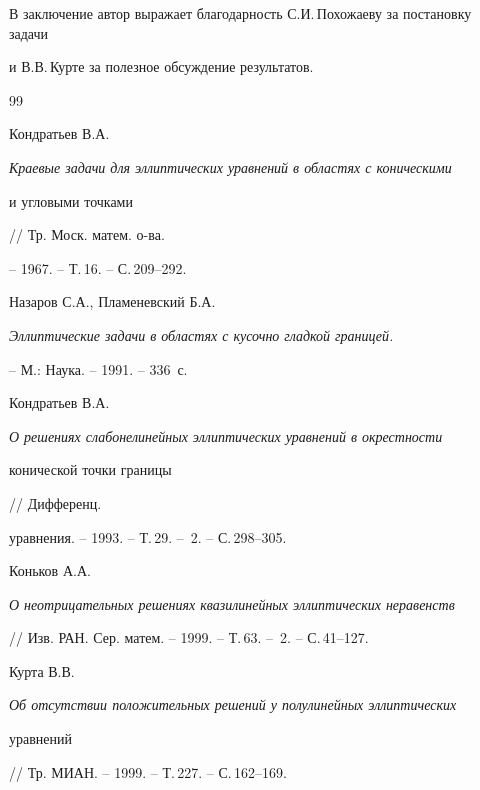 В заключение автор выражает благодарность С.И.\,Похожаеву за постановку задачи


и В.В.\,Кур\-те за полезное обсуждение результатов.








\begin{thebibliography}{99}







Кондратьев В.А.


{\em Краевые задачи для эллиптических уравнений в областях с коническими


и угловыми точками} // Тр. Моск. матем. о-ва.


-- 1967. -- Т.\,16. -- С.\,209--292.







Назаров С.А., Пламеневский Б.А.


{\em Эллиптические задачи в областях с кусочно гладкой границей.}


-- М.: Наука. -- 1991. -- 336~с.







Кондратьев В.А.


{\em О решениях слабонелинейных эллиптических уравнений в окрестности


конической точки границы} // Дифференц.


уравнения. -- 1993. -- Т.\,29. -- \No\,2. -- С.\,298--305.





 Коньков А.А.


{\em О неотрицательных решениях квазилинейных эллиптических неравенств}


// Изв. РАН. Сер. матем. -- 1999. -- Т.\,63. -- \No\,2. -- С.\,41--127.





 Курта В.В.


{\em Об отсутствии положительных решений у полулинейных эллиптических 


уравнений} // Тр. МИАН. -- 1999. -- Т.\,227. -- С.\,162--169.






\end{thebibliography}
